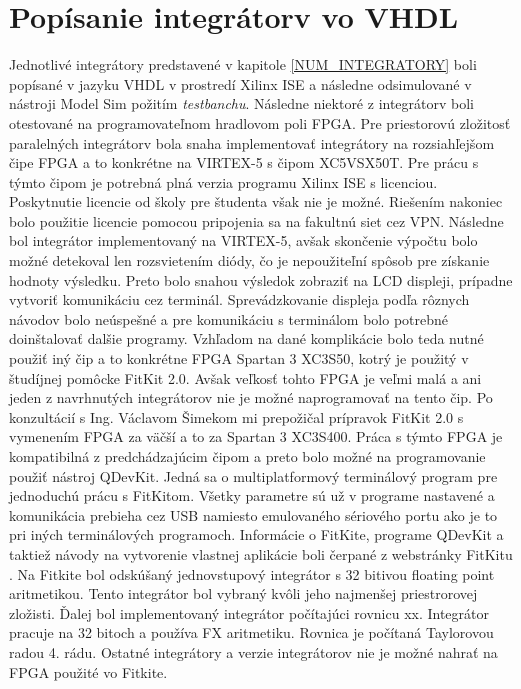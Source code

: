 \chapter{Popísanie integrátorv vo VHDL}
Jednotlivé integrátory predstavené v kapitole \ref{NUM_INTEGRATORY} boli popísané v jazyku VHDL v prostredí Xilinx ISE a následne odsimulované v nástroji Model Sim požitím \textit{testbanchu}. Následne niektoré z integrátorv boli otestované na programovateľnom hradlovom poli FPGA.
Pre priestorovú zložitosť paralelných integrátorv bola snaha implementovať integrátory na rozsiahľejšom čipe FPGA a to konkrétne na VIRTEX-5 s čipom XC5VSX50T. Pre prácu s týmto čipom je potrebná plná verzia programu Xilinx ISE s licenciou. Poskytnutie licencie od školy pre študenta však nie je možné. Riešením nakoniec bolo použitie licencie pomocou pripojenia sa na fakultnú siet cez VPN. Následne bol integrátor implementovaný na VIRTEX-5, avšak skončenie výpočtu bolo možné detekoval len rozsvietením diódy, čo je nepoužiteľní spôsob pre získanie hodnoty výsledku. Preto bolo snahou výsledok zobraziť na LCD displeji, prípadne vytvoriť komunikáciu cez terminál. Sprevádzkovanie displeja podľa rôznych návodov bolo neúspešné a pre komunikáciu s terminálom bolo potrebné doinštalovať dalšie programy. Vzhľadom na dané komplikácie bolo teda nutné použiť iný čip a to konkrétne FPGA Spartan 3 XC3S50, kotrý je použitý v študíjnej pomôcke FitKit 2.0. Avšak veľkosť tohto FPGA je veľmi malá a ani jeden z navrhnutých integrátorov nie je možné naprogramovať na tento čip. Po konzultácií s Ing. Václavom Šimekom mi prepožičal prípravok FitKit 2.0 s vymenením FPGA za väčší a to za Spartan 3 XC3S400. Práca s týmto FPGA je kompatibilná z predchádzajúcim čipom a preto bolo možné na programovanie použiť nástroj QDevKit. Jedná sa o multiplatformový terminálový program pre jednoduchú prácu s FitKitom. Všetky parametre sú už v programe nastavené a komunikácia prebieha cez USB namiesto emulovaného sériového portu ako je to pri iných terminálových programoch. Informácie o FitKite, programe QDevKit a taktiež návody na vytvorenie vlastnej aplikácie boli čerpané z webstránky FitKitu \cite{fitkit}.
Na Fitkite bol odskúšaný jednovstupový integrátor s 32 bitivou floating point aritmetikou. Tento integrátor bol vybraný kvôli jeho najmenšej priestrorovej zložisti. Ďalej bol implementovaný integrátor počítajúci rovnicu xx. Integrátor pracuje na 32 bitoch a používa FX aritmetiku. Rovnica je počítaná Taylorovou radou 4. rádu. Ostatné integrátory a verzie integrátorov nie je možné nahrať na FPGA použité vo Fitkite.

